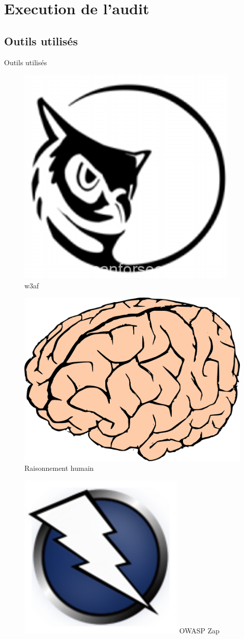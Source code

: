 \documentclass{beamer}
\begin{document}
\section{Execution de l'audit}	
\subsection{Outils utilisés} 
\begin{frame}{Outils utilisés}
	\begin{figure}
		\centering
		\begin{minipage}{.3\textwidth}
			\centering
			\includegraphics[width=.4\linewidth]{schemas/images/w3af.png}
			\break
			w3af
		\end{minipage}%
		\begin{minipage}{.3\textwidth}
			\centering
			\includegraphics[width=.4\linewidth]{schemas/images/brain.png}
			\break 
			Raisonnement humain
		\end{minipage}
		\begin{minipage}{.3\textwidth}
			\centering
			\includegraphics[width=.4\linewidth]{schemas/images/zap.png}
			\break 
			OWASP Zap
		\end{minipage}
	\end{figure}	
\end{frame}
\end{document}
